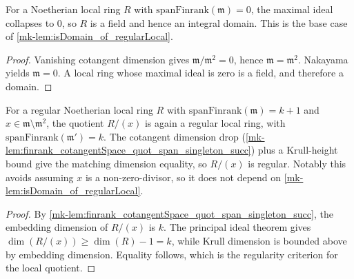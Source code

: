\begin{lemma}\label{mk-lem:isDomain_of_isLocalRing_of_spanFinrank_maximalIdeal_eq_zero}
  \leanok

  For a Noetherian local ring \(R\) with \(\text{spanFinrank}(\mathfrak m) = 0\), the maximal
  ideal collapses to \(0\), so \(R\) is a field and hence an integral domain. This is the
  base case of \ref{mk-lem:isDomain_of_regularLocal}.
\end{lemma}
\begin{proof}
  \leanok

Vanishing cotangent dimension gives
  \(\mathfrak m/\mathfrak m^2=0\), hence
  \(\mathfrak m=\mathfrak m^2\). Nakayama yields \(\mathfrak m=0\).
  A local ring whose maximal ideal is zero is a field, and therefore a domain.
\end{proof}

\begin{lemma}\label{mk-lem:regularLocal_quotient_isRegularLocal_of_notMemSq}
  \leanok

  For a regular Noetherian local ring \(R\) with \(\text{spanFinrank}(\mathfrak m) = k + 1\)
  and \(x \in \mathfrak m \setminus \mathfrak m^2\), the quotient \(R / (x)\) is again a regular
  local ring, with \(\text{spanFinrank}(\mathfrak m') = k\). The cotangent dimension drop
  (\ref{mk-lem:finrank_cotangentSpace_quot_span_singleton_succ}) plus a Krull-height bound
  give the matching dimension equality, so \(R/(x)\) is regular. Notably this avoids
  assuming \(x\) is a non-zero-divisor, so it does not depend on
  \ref{mk-lem:isDomain_of_regularLocal}.
\end{lemma}
\begin{proof}
  \leanok

By \ref{mk-lem:finrank_cotangentSpace_quot_span_singleton_succ},
  the embedding dimension of \(R/(x)\) is \(k\). The principal ideal
  theorem gives \(\dim(R/(x))\geq\dim(R)-1=k\), while Krull dimension is
  bounded above by embedding dimension. Equality follows, which is the
  regularity criterion for the local quotient.
\end{proof}

